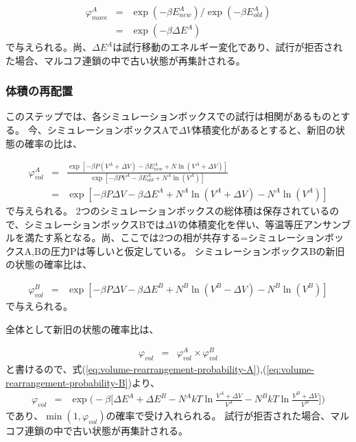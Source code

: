 \documentclass[titlepage]{jsreport}
\begin{document}
\large
\begin{eqnarray}
\varphi_{move}^A &=& \exp(-{\beta}E_{new}^A)/\exp(-{\beta}E_{old}^A) \nonumber\\
                 &=& \exp(-{\beta}{\Delta}E^A)\label{eq:particle-displacement-probability}
\end{eqnarray}
\normalsize
で与えられる。尚、${\Delta}E^A$は試行移動のエネルギー変化であり、試行が拒否された場合、マルコフ連鎖の中で古い状態が再集計される。

\subsubsection{体積の再配置}\label{principle-subsubsec:volume-rearrangement}
このステップでは、各シミュレーションボックスでの試行は相関があるものとする。
今、シミュレーションボックスAで$\Delta{V}$体積変化があるとすると、新旧の状態の確率の比は、

\large
\begin{eqnarray}
\varphi_{vol}^A &=& \frac{\exp[-{\beta}P(V^A+{\Delta}V)-{\beta}E^A_{new}+N\ln(V^A+{\Delta}V)]}{\exp[-{\beta}PV^A-{\beta}E^A_{old}+N^A\ln(V^A)]} \nonumber\\
                &=& \exp[-{\beta}P{\Delta}V-{\beta}{\Delta}E^A+N^A\ln(V^A+{\Delta}V)-N^A\ln(V^A)]\label{eq:volume-rearrangement-probability-A}
\end{eqnarray}
\normalsize
で与えられる。
2つのシミュレーションボックスの総体積は保存されているので、シミュレーションボックスBでは${\Delta}V$の体積変化を伴い、等温等圧アンサンブルを満たす系となる。尚、ここでは2つの相が共存する=シミュレーションボックスA,Bの圧力Pは等しいと仮定している。
シミュレーションボックスBの新旧の状態の確率比は、

\large
\begin{eqnarray}
\varphi_{vol}^B &=& \exp[-{\beta}P{\Delta}V-{\beta}{\Delta}E^B+N^B\ln(V^B-{\Delta}V)-N^B\ln(V^B)]\label{eq:volume-rearrangement-probability-B}
\end{eqnarray}
\normalsize
で与えられる。

全体として新旧の状態の確率比は、

\large
\begin{eqnarray}
\varphi_{vol} &=& \varphi_{vol}^A×\varphi_{vol}^B \nonumber
\end{eqnarray}
\normalsize
と書けるので、式(\ref{eq:volume-rearrangement-probability-A}),(\ref{eq:volume-rearrangement-probability-B})より、
\large
\begin{eqnarray}
\varphi_{vol} &=& \exp\Bigg(-\beta\bigg[{\Delta}E^A+{\Delta}E^B-N^{A}kT\ln{\frac{V^A+\Delta{V}}{V^A}}-N^{B}kT\ln{\frac{V^B+\Delta{V}}{V^B}}\bigg]\Bigg) \label{eq:volume-rearrangement-probability-all}
\end{eqnarray}
であり、$\min(1, \varphi_{vol})$の確率で受け入れられる。
試行が拒否された場合、マルコフ連鎖の中で古い状態が再集計される。
\end{document}
